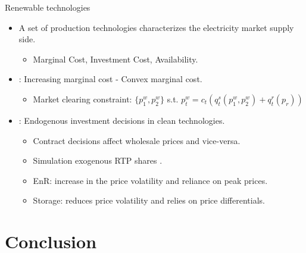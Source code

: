 \documentclass{class}
\begin{document}
\begin{frame}{Renewable technologies}

\begin{itemize}

\item A set of production technologies characterizes the electricity market supply side.

\begin{itemize}
    \item Marginal Cost, Investment Cost, Availability. 
\end{itemize}

\vfill

\item {}: Increasing marginal cost - Convex marginal cost. 

\begin{itemize}
    \item  Market clearing constraint: $\{p_1^w,p_2^w\}$ s.t. $p_t^w = c_t(q_t^s(p_1^w,p_2^w)+ q_t^r(p_r)) $
\end{itemize}

\vfill 

\item  {}: Endogenous investment decisions in clean technologies.

\begin{itemize}
    \item Contract decisions affect wholesale prices and vice-versa.
    \item Simulation \cite{NBERw29133} exogenous RTP shares \cite{Boom2021,Ambec2021}. 
    \item EnR: increase in the price volatility and reliance on peak prices.
    \item Storage: reduces price volatility and relies on price differentials.
\end{itemize}

\end{itemize}

    
\end{frame}



\section{Conclusion}
\end{document}
